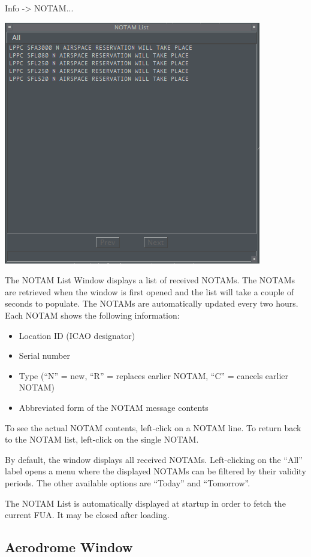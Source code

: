 \documentclass[11pt,a4paper]{memoir}
\begin{document}
\textit{} Info -> NOTAM...

\includegraphics{img/notamlist.png}

The NOTAM List Window displays a list of received NOTAMs. The NOTAMs are retrieved when the window is first opened and the list will take a couple of seconds to populate. The NOTAMs are automatically updated every two hours. Each NOTAM shows the following information:

\begin{itemize}
    \item Location ID (ICAO designator)
    \item Serial number
    \item Type (“N” = new, “R” = replaces earlier NOTAM, “C” = cancels earlier NOTAM)
    \item Abbreviated form of the NOTAM message contents
\end{itemize}

To see the actual NOTAM contents, left-click on a NOTAM line. To return back to the NOTAM list, left-click on the single NOTAM.

By default, the window displays all received NOTAMs. Left-clicking on the “All” label opens a menu where the displayed NOTAMs can be filtered by their validity periods. The other available options are “Today” and “Tomorrow”.

The NOTAM List is automatically displayed at startup in order to fetch the current FUA. It may be closed after loading.

\subsection{Aerodrome Window}
\label{win:adw}
\end{document}
